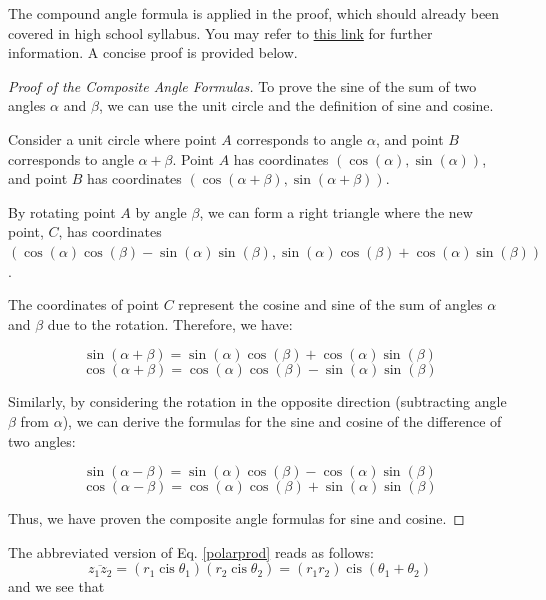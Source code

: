 \documentclass[
	12pt, %
	fleqn, %
	a4paper, %
]{LegrandOrangeBook}
\begin{document}
\begin{remark}
The compound angle formula is applied in the proof, which should already been covered in high school
syllabus. You may refer to \href{https://en.wikipedia.org/wiki/List_of_trigonometric_identities}{this link} for further information.
A concise proof is provided below.
\begin{proof}[Proof of the Composite Angle Formulas]
    To prove the sine of the sum of two angles \( \alpha \) and \( \beta \), we can use the unit circle and the definition of sine and cosine.
    
    Consider a unit circle where point \( A \) corresponds to angle \( \alpha \), and point \( B \) corresponds to angle \( \alpha + \beta \). Point \( A \) has coordinates \( (\cos(\alpha), \sin(\alpha)) \), and point \( B \) has coordinates \( (\cos(\alpha + \beta), \sin(\alpha + \beta)) \).
    
    By rotating point \( A \) by angle \( \beta \), we can form a right triangle where the new point, \( C \), has coordinates \( (\cos(\alpha)\cos(\beta) - \sin(\alpha)\sin(\beta), \sin(\alpha)\cos(\beta) + \cos(\alpha)\sin(\beta)) \).
    
    The coordinates of point \( C \) represent the cosine and sine of the sum of angles \( \alpha \) and \( \beta \) due to the rotation. Therefore, we have:
    
    \[
    \sin(\alpha + \beta) = \sin(\alpha)\cos(\beta) + \cos(\alpha)\sin(\beta)
    \]
    \[
    \cos(\alpha + \beta) = \cos(\alpha)\cos(\beta) - \sin(\alpha)\sin(\beta)
    \]
    
    Similarly, by considering the rotation in the opposite direction (subtracting angle \( \beta \) from \( \alpha \)), we can derive the formulas for the sine and cosine of the difference of two angles:
    
    \[
    \sin(\alpha - \beta) = \sin(\alpha)\cos(\beta) - \cos(\alpha)\sin(\beta)
    \]
    \[
    \cos(\alpha - \beta) = \cos(\alpha)\cos(\beta) + \sin(\alpha)\sin(\beta)
    \]
    
    Thus, we have proven the composite angle formulas for sine and cosine.

    \end{proof}
\end{remark}

The abbreviated version of Eq. \ref{polarprod} reads as follows:
\[
\overline{z_1z_2} = (r_1 \operatorname{cis} \theta_1)(r_2 \operatorname{cis} \theta_2) = (r_1r_2) \operatorname{cis} (\theta_1 + \theta_2)
\]
and we see that
\end{document}
